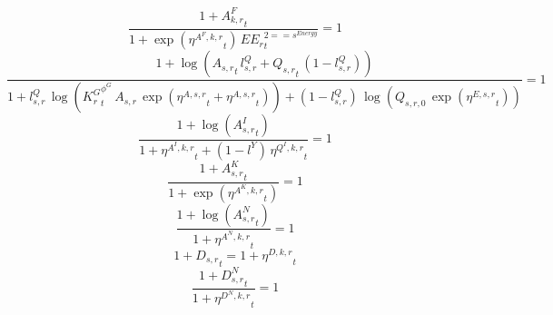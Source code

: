 \noindent[name= `sector TFP final demand 2 1']
\begin{dmath}
\frac{1+{{A^{F}_{k,r}}}_{t}}{1+\exp\left({{\eta^{A^F,k,r}}}_{t}\right)\, {{EE_r}}_{t}^{2=={{s^{Energy}}}}}=1
\end{dmath}
\noindent[name= `sector TFP 2 1']
\begin{dmath}
\frac{1+\log\left({{A_{s,r}}}_{t}\, {{l^{Q}_{s,r}}}+{{Q_{s,r}}}_{t}\, \left(1-{{l^{Q}_{s,r}}}\right)\right)}{1+{{l^{Q}_{s,r}}}\, \log\left({{K^G_{r}}}_{t}^{{{\phi^{G}}}}\, {{A_{s,r}}}\, \exp\left({{\eta^{A,s,r}}}_{t}+{{\eta^{A,s,r}}}_{t}\right)\right)+\left(1-{{l^{Q}_{s,r}}}\right)\, \log\left({{Q_{s,r,0}}}\, \exp\left({{\eta^{E,s,r}}}_{t}\right)\right)}=1
\end{dmath}
\noindent[name= `intermediate input productivity 2 1']
\begin{dmath}
\frac{1+\log\left({{A^{I}_{s,r}}}_{t}\right)}{1+{{\eta^{A^{I},k,r}}}_{t}+\left(1-{{l^{Y}}}\right)\, {{\eta^{Q^{I},k,r}}}_{t}}=1
\end{dmath}
\noindent[name= `capital productivity shock 2 1']
\begin{dmath}
\frac{1+{{A^{K}_{s,r}}}_{t}}{1+\exp\left({{\eta^{A^{K},k,r}}}_{t}\right)}=1
\end{dmath}
\noindent[name= `labour productivity shock 2 1']
\begin{dmath}
\frac{1+\log\left({{A^{N}_{s,r}}}_{t}\right)}{1+{{\eta^{A^{N},k,r}}}_{t}}=1
\end{dmath}
\noindent[name= `TFP damage 2 1']
\begin{dmath}
1+{{D_{s,r}}}_{t}=1+{{\eta^{D,k,r}}}_{t}
\end{dmath}
\noindent[name= `labour damage 2 1']
\begin{dmath}
\frac{1+{{D^N_{s,r}}}_{t}}{1+{{\eta^{D^{N},k,r}}}_{t}}=1
\end{dmath}
\noindent[name= `capital damage 2 1']
